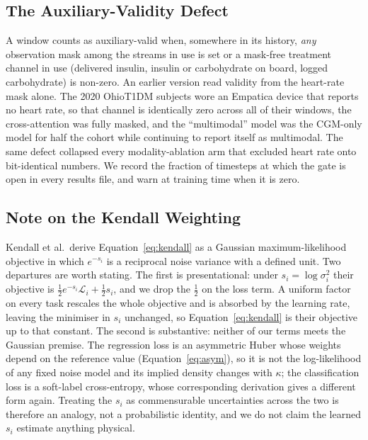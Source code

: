 \subsection{The Auxiliary-Validity Defect}
\label{sec:appendix_aux_validity}

A window counts as
auxiliary-valid when, somewhere in its history, \emph{any} observation mask
among the streams in use is set or a mask-free treatment channel in use
(delivered insulin, insulin or carbohydrate on board, logged carbohydrate) is
non-zero. An earlier version read validity from the heart-rate mask alone. The 2020
OhioT1DM subjects wore an Empatica device that reports no heart rate, so that
channel is identically zero across all of their windows, the cross-attention was
fully masked, and the ``multimodal'' model was the CGM-only model for half the
cohort while continuing to report itself as multimodal. The same defect collapsed every modality-ablation arm that excluded
heart rate onto bit-identical numbers. We record the fraction of timesteps at
which the gate is open in every results file, and warn at training time when it
is zero.

\subsection{Note on the Kendall Weighting}
\label{sec:appendix_kendall}

Kendall et al.\ derive Equation~\ref{eq:kendall} as a Gaussian
maximum-likelihood objective in which $e^{-s_i}$ is a reciprocal noise variance
with a defined unit. Two departures are worth stating. The first is
presentational: under $s_i = \log \sigma_i^2$ their objective is
$\tfrac{1}{2}e^{-s_i}\mathcal{L}_i + \tfrac{1}{2}s_i$, and we drop the
$\tfrac{1}{2}$ on the loss term. A uniform factor on every task rescales the
whole objective and is absorbed by the learning rate, leaving the minimiser in
$s_i$ unchanged, so Equation~\ref{eq:kendall} is their objective up to that
constant. The second is substantive: neither of our terms meets the Gaussian
premise. The regression
loss is an asymmetric Huber whose weights depend on the reference value
(Equation~\ref{eq:asym}), so it is not the log-likelihood of any fixed noise
model and its implied density changes with $\kappa$; the classification loss is
a soft-label cross-entropy, whose corresponding derivation gives a different
form again. Treating the $s_i$ as commensurable uncertainties across the two is
therefore an analogy, not a probabilistic identity, and we do not claim the
learned $s_i$ estimate anything physical.

